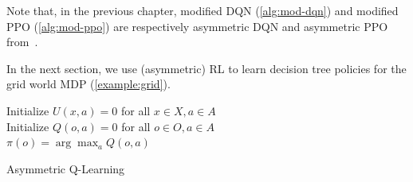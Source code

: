 Note that, in the previous chapter, modified DQN (\ref{alg:mod-dqn}) and modified PPO (\ref{alg:mod-ppo}) are respectively asymmetric DQN and asymmetric PPO from~\cite{baisero-dqn,baisero-ppo}.

In the next section, we use (asymmetric) RL to learn decision tree policies for the grid world MDP (\ref{example:grid}).

\begin{algorithm}
    Initialize $U(x,a) = 0$ for all $x \in X, a \in A$ \\
    Initialize $Q(o,a) = 0$ for all $o \in O, a \in A$ \\

    $\pi(o) = \arg\max_a Q(o,a)$ 
    \caption{Asymmetric Q-Learning}\label{alg:asymqlearning}
\end{algorithm}


